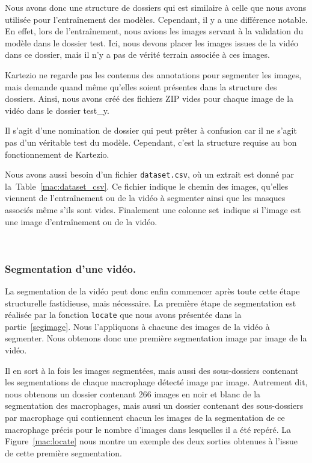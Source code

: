 \documentclass[a4paper,12pt]{report}
\newcommand{\figref}[1]{Figure~\ref{#1}}
\newcommand{\tabref}[1]{Table~\ref{#1}}
\begin{document}
Nous avons donc une structure de dossiers qui est similaire à celle que nous avons utilisée pour l'entraînement des modèles. Cependant, il y a une différence notable. En effet, lors de l'entraînement, nous avions les images servant à la validation du modèle dans le dossier \og test\fg. Ici, nous devons placer les images issues de la vidéo dans ce dossier, mais il n'y a pas de vérité terrain associée à ces images.

Kartezio ne regarde pas les contenus des annotations pour segmenter les images, mais demande quand même qu'elles soient présentes dans la structure des dossiers. Ainsi, nous avons créé des fichiers ZIP vides pour chaque image de la vidéo dans le dossier \og test\_y\fg.

Il s'agit d'une nomination de dossier qui peut prêter à confusion car il ne s'agit pas d'un véritable test du modèle. Cependant, c'est la structure requise au bon fonctionnement de Kartezio.


Nous avons aussi besoin d'un fichier \texttt{dataset.csv}, où un extrait est donné par la~\tabref{mac:dataset_csv}. Ce fichier indique le chemin des images, qu'elles viennent de l'entraînement ou de la vidéo à segmenter ainsi que les masques associés même s'ils sont vides. Finalement une colonne \og set\fg\ indique si l'image est une image d'entraînement ou de la vidéo.

\




\subsubsection*{Segmentation d'une vidéo.}

La segmentation de la vidéo peut donc enfin commencer après toute cette étape structurelle fastidieuse, mais nécessaire. La première étape de segmentation est réalisée par la fonction \texttt{locate} que nous avons présentée dans la partie~\ref{segimage}. Nous l'appliquons à chacune des images de la vidéo à segmenter. Nous obtenons donc une première segmentation image par image de la vidéo.

Il en sort à la fois les images segmentées, mais aussi des sous-dossiers contenant les segmentations de chaque macrophage détecté image par image. Autrement dit, nous obtenons un dossier contenant 266 images en noir et blanc de la segmentation des macrophages, mais aussi un dossier contenant des sous-dossiers par macrophage qui contiennent chacun les images de la segmentation de ce macrophage précis pour le nombre d'images dans lesquelles il a été repéré. La \figref{mac:locate} nous montre un exemple des deux sorties obtenues à l'issue de cette première segmentation.
\end{document}
